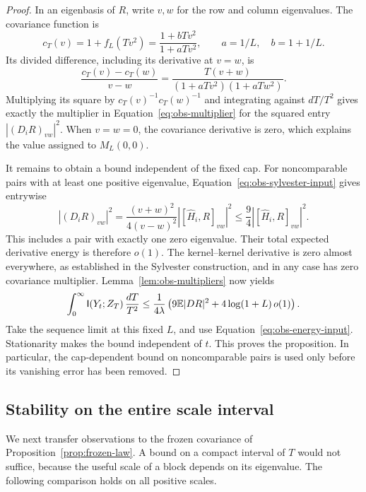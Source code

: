 \begin{proof}
In an eigenbasis of $R$, write $v,w$ for the row and column
eigenvalues.  The covariance function is
\[
 c_T(v)=1+f_L(Tv^2)
       =\frac{1+bTv^2}{1+aTv^2},
 \qquad a=1/L,\quad b=1+1/L.
\]
Its divided difference, including its derivative at $v=w$, is
\[
 \frac{c_T(v)-c_T(w)}{v-w}
 =\frac{T(v+w)}{(1+aTv^2)(1+aTw^2)}.
\]
Multiplying its square by $c_T(v)^{-1}c_T(w)^{-1}$ and integrating
against $dT/T^2$ gives exactly the multiplier in
Equation~\eqref{eq:obs-multiplier} for the squared entry
$|(D_iR)_{vw}|^2$.  When $v=w=0$, the covariance derivative is zero,
which explains the value assigned to $M_L(0,0)$.

It remains to obtain a bound independent of the fixed cap.  For
noncomparable pairs with at least one positive eigenvalue,
Equation~\eqref{eq:obs-sylvester-input} gives entrywise
\[
 |(D_iR)_{vw}|^2
 =\frac{(v+w)^2}{4(v-w)^2}
       |[\widehat H_i,R]_{vw}|^2
 \le\frac94|[\widehat H_i,R]_{vw}|^2.
\]
This includes a pair with exactly one zero eigenvalue.  Their total
expected derivative energy is therefore $o(1)$.  The kernel--kernel
derivative is zero almost everywhere, as established in the Sylvester
construction, and in any case has zero covariance multiplier.
Lemma~\ref{lem:obs-multipliers} now yields
\[
 \int_0^\infty\mathsf I(Y_t;Z_T)\,\frac{dT}{T^2}
 \le\frac1{4\lambda}
 \left(9\mathbb E|DR|^2+4\log(1+L)\,o(1)\right).
\]
Take the sequence limit at this fixed $L$, and use
Equation~\eqref{eq:obs-energy-input}.  Stationarity makes the bound
independent of $t$.  This proves the proposition.  In particular, the
cap-dependent bound on noncomparable pairs is used only before its
vanishing error has been removed.
\end{proof}

\subsection{Stability on the entire scale interval}

We next transfer observations to the frozen covariance of
Proposition~\ref{prop:frozen-law}.  A bound on a compact interval of
$T$ would not suffice, because the useful scale of a block depends on
its eigenvalue.  The following comparison holds on all positive
scales.

